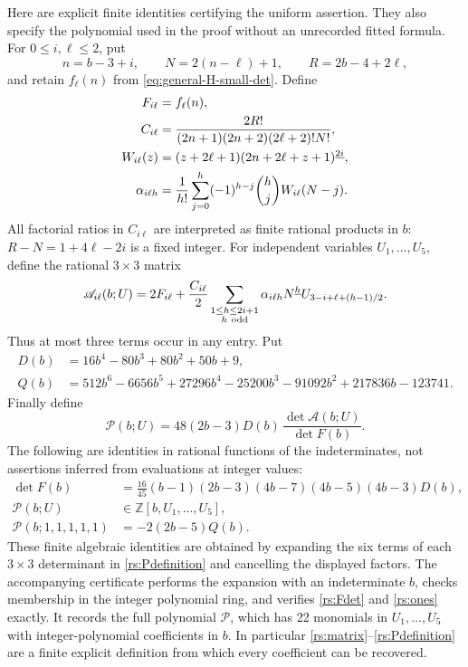 Here are explicit finite identities certifying the uniform assertion.
They also specify the polynomial used in the proof without an
unrecorded fitted formula. For $0\le i,\ell\le2$, put
\[
 n=b-3+i,\qquad N=2(n-\ell)+1,\qquad R=2b-4+2\ell,
\]
and retain $f_\ell(n)$ from
\eqref{eq:general-H-small-det}. Define
\begin{align}
 F_{i\ell}&=f_\ell(n),\notag\\
 C_{i\ell}&=\frac{2R!}
 {(2n+1)(2n+2)(2\ell+2)!N!},\label{rs:C}\\
 W_{i\ell}(z)&=(z+2\ell+1)
                 (2n+2\ell+z+1)^{\underline{2i}},\notag\\
 \alpha_{i\ell h}&=\frac1{h!}\sum_{j=0}^h
             (-1)^{h-j}\binom hj W_{i\ell}(N-j).
 \label{rs:alpha}
\end{align}
All factorial ratios in $C_{i\ell}$ are interpreted as finite rational
products in $b$: $R-N=1+4\ell-2i$ is a fixed integer.
For independent variables $U_1,\ldots,U_5$, define the rational
$3\times3$ matrix
\begin{equation}\label{rs:matrix}
 \mathscr A_{i\ell}(b;U)
 =2F_{i\ell}+\frac{C_{i\ell}}2
 \sum_{\substack{1\le h\le2i+1\\h\ {\rm odd}}}
 \alpha_{i\ell h}N^{\underline h}
       U_{3-i+\ell+(h-1)/2}.
\end{equation}
Thus at most three terms occur in any entry. Put
\begin{align}
 D(b)&=16b^4-80b^3+80b^2+50b+9,\label{rs:D}\\
 Q(b)&=512b^6-6656b^5+27296b^4-25200b^3
              -91092b^2+217836b-123741.\label{rs:Q}
\end{align}
Finally define
\begin{equation}\label{rs:Pdefinition}
 \mathscr P(b;U)
 =48(2b-3)D(b)\,\frac{\det\mathscr A(b;U)}{\det F(b)}.
\end{equation}
The following are identities in rational functions of the indeterminates,
not assertions inferred from evaluations at integer values:
\begin{align}
 \det F(b)&=\frac{16}{45}(b-1)(2b-3)(4b-7)(4b-5)(4b-3)D(b),
 \label{rs:Fdet}\\
 \mathscr P(b;U)&\in\mathbb Z[b,U_1,\ldots,U_5],
 \label{rs:integrality}\\
 \mathscr P(b;1,1,1,1,1)&=-2(2b-5)Q(b).
 \label{rs:ones}
\end{align}
These finite algebraic identities are obtained by expanding the six
terms of each $3\times3$ determinant in
\eqref{rs:Pdefinition} and cancelling the displayed factors.
The accompanying certificate performs the expansion with an
indeterminate $b$, checks membership in the integer polynomial ring,
and verifies \eqref{rs:Fdet} and \eqref{rs:ones} exactly. It records
the full polynomial $\mathscr P$, which has 22 monomials in
$U_1,\ldots,U_5$ with integer-polynomial coefficients in $b$.
In particular \eqref{rs:matrix}--\eqref{rs:Pdefinition} are a finite
explicit definition from which every coefficient can be recovered.

